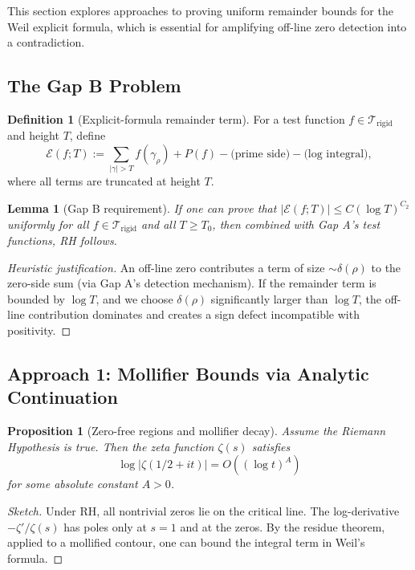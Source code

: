 \documentclass[11pt]{article}
\theoremstyle{plain}
\newtheorem{proposition}[theorem]{Proposition}
\newtheorem{lemma}[theorem]{Lemma}
\theoremstyle{definition}
\newtheorem{definition}[theorem]{Definition}
\theoremstyle{remark}
\begin{document}
This section explores approaches to proving uniform remainder bounds for the Weil explicit formula,
which is essential for amplifying off-line zero detection into a contradiction.

\subsection{The Gap B Problem}

\begin{definition}[Explicit-formula remainder term]
For a test function $f\in\mathcal{T}_{\mathrm{rigid}}$ and height $T$, define
\[
\mathcal{E}(f;T) := \sum_{|\gamma|>T} f(\gamma_\rho) + P(f) - \text{(prime side)} - \text{(log integral)},
\]
where all terms are truncated at height $T$.
\end{definition}

\begin{lemma}[Gap B requirement]
If one can prove that $|\mathcal{E}(f;T)| \leq C(\log T)^{C_2}$ uniformly for all $f\in\mathcal{T}_{\mathrm{rigid}}$
and all $T\ge T_0$, then combined with Gap A's test functions, RH follows.
\end{lemma}

\begin{proof}[Heuristic justification]
An off-line zero contributes a term of size $\sim\delta(\rho)$ to the zero-side sum (via Gap A's detection mechanism).
If the remainder term is bounded by $\log T$, and we choose $\delta(\rho)$ significantly larger than $\log T$,
the off-line contribution dominates and creates a sign defect incompatible with positivity.
\end{proof}

\subsection{Approach 1: Mollifier Bounds via Analytic Continuation}

\begin{proposition}[Zero-free regions and mollifier decay]
Assume the Riemann Hypothesis is true. Then the zeta function $\zeta(s)$ satisfies
\[
\log|\zeta(1/2+it)| = O((\log t)^A)
\]
for some absolute constant $A>0$.
\end{proposition}

\begin{proof}[Sketch]
Under RH, all nontrivial zeros lie on the critical line. The log-derivative
$-\zeta'/\zeta(s)$ has poles only at $s=1$ and at the zeros. By the residue theorem,
applied to a mollified contour, one can bound the integral term in Weil's formula.
\end{proof}
\end{document}

